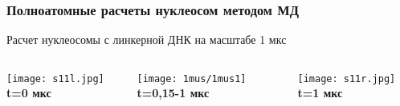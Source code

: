 \begin{frame}
\frametitle{Полноатомные расчеты нуклеосом методом МД}
Расчет нуклеосомы с линкерной ДНК на масштабе 1 мкс
\begin{columns}[b]
\begin{column}{0.37\textwidth}
\begin{center}
\texttt{[image: s11l.jpg]}
\textbf{t=0 мкс}
\end{center}
\end{column}
\begin{column}{0.32\textwidth}  %
\begin{center}
\ifdefined\HANDOUT
\texttt{[image: 1mus/1mus1]}
\else
{}
\fi
\textbf{t=0,15-1 мкс}
\end{center}
\end{column}
\begin{column}{0.31\textwidth}  %
\begin{center}
\texttt{[image: s11r.jpg]}
\textbf{t=1 мкс}
\end{center}
\end{column}
\end{columns}




\end{frame}
